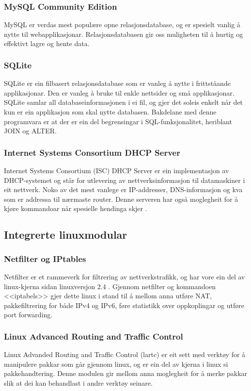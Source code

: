 \documentclass[nynorsk,12pt,a4paper,oneside]{book}
\begin{document}
\subsubsection{MySQL Community Edition}
MySQL er verdas mest populære opne relasjonsdatabase, og er spesielt vanlig å nytte til webapplikasjonar. Relasjonsdatabasen gir oss muligheten til å hurtig og effektivt lagre og hente data. \cite{mysqlwww} 

\subsubsection{SQLite}
SQLite er ein filbasert relasjonsdatabase som er vanleg å nytte i frittståande applikasjonar. Den er vanleg å bruke til enkle nettsider og små applikasjonar. SQLite samlar all databaseinformasjonen i ei fil, og gjer det soleis enkelt når det kun er ein applikasjon som skal nytte databasen\cite{sqlabout}. Bakdelane med denne programvara er at der er ein del begrensingar i SQL-funksjonalitet, heriblant JOIN og ALTER. \cite{sqlimit}

\subsubsection{Internet Systems Consortium DHCP Server}
Internet Systems Consortium (ISC) DHCP Server er ein implementasjon av DHCP-systemet og står for utlevering av nettverksinformasjon til datamaskiner i eit nettverk. Noko av det mest vanlege er IP-addresser, DNS-informasjon og kva som er addressa til nærmaste router. Denne serveren har også moglegheit for å kjøre kommandoar når spesielle hendinga skjer \cite{dhcpconf, dhcpdman}. 

\subsection{Integrerte linuxmodular}
\subsubsection{Netfilter og IPtables}
Netfilter er et rammeverk for filtrering av nettverkstrafikk, og har vore ein del av linux-kjerna sidan linuxversjon 2.4 \cite{netfiltercore}. Gjennom netfilter og kommandoen <<iptabels>> gjer dette linux i stand til å mellom anna utføre NAT, pakkefiltrering for både IPv4 og IPv6, føre statistikk over oppkoplingar og utføre port forwarding. 

\subsubsection{Linux Advanced Routing and Traffic Control}
Linux Advanded Routing and Traffic Control (lartc) er eit sett med verktøy for å manipulere pakkar som går gjennom linux, og er ein del av kjerna i linux si pakkehandtering. \cite{lartcintro} Denne modulen gir mellom anna moglegheit for å merke pakkar slik at dei kan behandlast i andre verktøy seinare. 
\end{document}
